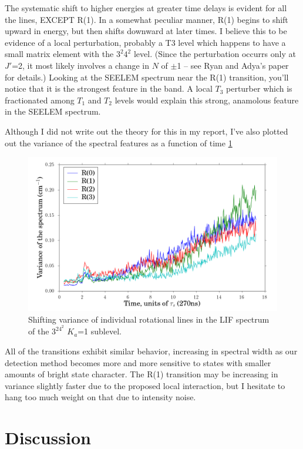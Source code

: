 \documentclass[12pt,draft]{mitthesis}
\begin{document}
The systematic shift to higher energies at greater time delays is
evident for all the lines, EXCEPT R(1).  In a somewhat peculiar
manner, R(1) begins to shift upward in energy, but then shifts
downward at later times. I believe this to be evidence of a local
perturbation, probably a T3 level which happens to have a small matrix
element with the $3^2 4^2$ level.  (Since the perturbation occurrs
only at $J'$=2, it most likely involves a change in $N$ of $\pm$1 --
see Ryan and Adya's paper for details.)  Looking at the SEELEM
spectrum near the R(1) transition, you'll notice that it is the
strongest feature in the band.  A local $T_3$ perturber which is
fractionated among $T_1$ and $T_2$ levels would explain this strong,
anamolous feature in the SEELEM spectrum.

Although I did not write out the theory for this in my report, I've
also plotted out the variance of the spectral features as a function
of time \ref{fig:32b2-var-delay}

\begin{figure}
  \caption{Shifting variance of individual rotational lines in the LIF
    spectrum of the $3^24^2$ $K_a$=1 sublevel.}
  \label{fig:32b2-var-delay}
  \centering
  \includegraphics[width=6in]{32b2-variance-delay.png}
\end{figure}

All of the transitions exhibit similar behavior, increasing in
spectral width as our detection method becomes more and more sensitive
to states with smaller amounts of bright state character.  The R(1)
transition may be increasing in variance slightly faster due to the
proposed local interaction, but I hesitate to hang too much weight on
that due to intensity noise.

\section{Discussion}
\end{document}
